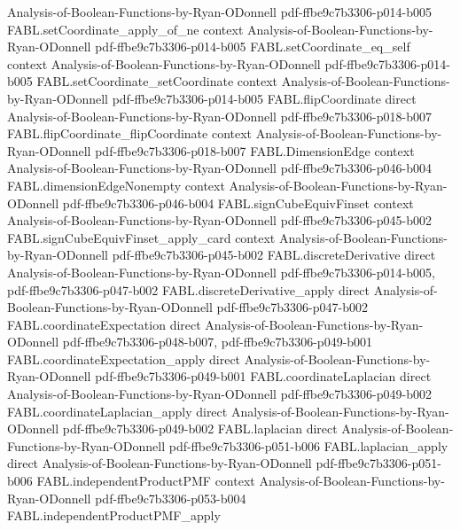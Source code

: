 \begin{theorem}
  {Analysis-of-Boolean-Functions-by-Ryan-ODonnell}
  {pdf-ffbe9c7b3306-p014-b005}
\proofstep
  {FABL.setCoordinate_apply_of_ne}
  {context}
  {Analysis-of-Boolean-Functions-by-Ryan-ODonnell}
  {pdf-ffbe9c7b3306-p014-b005}
\proofstep
  {FABL.setCoordinate_eq_self}
  {context}
  {Analysis-of-Boolean-Functions-by-Ryan-ODonnell}
  {pdf-ffbe9c7b3306-p014-b005}
\proofstep
  {FABL.setCoordinate_setCoordinate}
  {context}
  {Analysis-of-Boolean-Functions-by-Ryan-ODonnell}
  {pdf-ffbe9c7b3306-p014-b005}
\proofstep
  {FABL.flipCoordinate}
  {direct}
  {Analysis-of-Boolean-Functions-by-Ryan-ODonnell}
  {pdf-ffbe9c7b3306-p018-b007}
\proofstep
  {FABL.flipCoordinate_flipCoordinate}
  {context}
  {Analysis-of-Boolean-Functions-by-Ryan-ODonnell}
  {pdf-ffbe9c7b3306-p018-b007}
\proofstep
  {FABL.DimensionEdge}
  {context}
  {Analysis-of-Boolean-Functions-by-Ryan-ODonnell}
  {pdf-ffbe9c7b3306-p046-b004}
\proofstep
  {FABL.dimensionEdgeNonempty}
  {context}
  {Analysis-of-Boolean-Functions-by-Ryan-ODonnell}
  {pdf-ffbe9c7b3306-p046-b004}
\proofstep
  {FABL.signCubeEquivFinset}
  {context}
  {Analysis-of-Boolean-Functions-by-Ryan-ODonnell}
  {pdf-ffbe9c7b3306-p045-b002}
\proofstep
  {FABL.signCubeEquivFinset_apply_card}
  {context}
  {Analysis-of-Boolean-Functions-by-Ryan-ODonnell}
  {pdf-ffbe9c7b3306-p045-b002}
\proofstep
  {FABL.discreteDerivative}
  {direct}
  {Analysis-of-Boolean-Functions-by-Ryan-ODonnell}
  {pdf-ffbe9c7b3306-p014-b005,
    pdf-ffbe9c7b3306-p047-b002}
\proofstep
  {FABL.discreteDerivative_apply}
  {direct}
  {Analysis-of-Boolean-Functions-by-Ryan-ODonnell}
  {pdf-ffbe9c7b3306-p047-b002}
\proofstep
  {FABL.coordinateExpectation}
  {direct}
  {Analysis-of-Boolean-Functions-by-Ryan-ODonnell}
  {pdf-ffbe9c7b3306-p048-b007,
    pdf-ffbe9c7b3306-p049-b001}
\proofstep
  {FABL.coordinateExpectation_apply}
  {direct}
  {Analysis-of-Boolean-Functions-by-Ryan-ODonnell}
  {pdf-ffbe9c7b3306-p049-b001}
\proofstep
  {FABL.coordinateLaplacian}
  {direct}
  {Analysis-of-Boolean-Functions-by-Ryan-ODonnell}
  {pdf-ffbe9c7b3306-p049-b002}
\proofstep
  {FABL.coordinateLaplacian_apply}
  {direct}
  {Analysis-of-Boolean-Functions-by-Ryan-ODonnell}
  {pdf-ffbe9c7b3306-p049-b002}
\proofstep
  {FABL.laplacian}
  {direct}
  {Analysis-of-Boolean-Functions-by-Ryan-ODonnell}
  {pdf-ffbe9c7b3306-p051-b006}
\proofstep
  {FABL.laplacian_apply}
  {direct}
  {Analysis-of-Boolean-Functions-by-Ryan-ODonnell}
  {pdf-ffbe9c7b3306-p051-b006}
\proofstep
  {FABL.independentProductPMF}
  {context}
  {Analysis-of-Boolean-Functions-by-Ryan-ODonnell}
  {pdf-ffbe9c7b3306-p053-b004}
\proofstep
  {FABL.independentProductPMF_apply}

\end{theorem}

